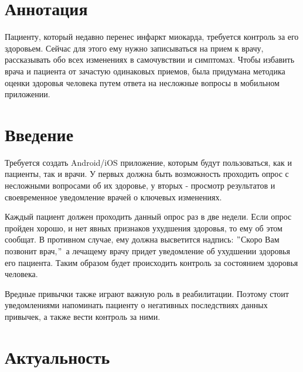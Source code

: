 \documentclass[a4paper,12pt]{article}
\begin{document}
    \section*{Аннотация}

    Пациенту, который недавно перенес инфаркт миокарда, требуется контроль за его здоровьем.
    Сейчас для этого ему нужно записываться на прием к врачу, рассказывать обо всех изменениях в самочувствии и симптомах.
    Чтобы избавить врача и пациента от зачастую одинаковых приемов, была придумана методика оценки здоровья человека путем ответа на несложные вопросы в мобильном приложении.

    \newpage

    \section*{Введение}
    \label{sec:4}
    Требуется создать Android/iOS приложение, которым будут пользоваться, как и пациенты, так и врачи.
    У первых должна быть возможность проходить опрос с несложными вопросами об их здоровье, у вторых - просмотр результатов и своевременное уведомление врачей о ключевых изменениях.  \par
    Каждый пациент должен проходить данный опрос раз в две недели.
    Если опрос пройден хорошо, и нет явных признаков ухудшения здоровья, то ему об этом сообщат.
    В противном случае, ему должна высветится надпись: \("\)Скоро Вам позвонит врач,\("\)\, а лечащему врачу придет уведомление об ухудшении здоровья его пациента.
    Таким образом будет происходить контроль за состоянием здоровья человека. \par
    Вредные привычки также играют важную роль в реабилитации.
    Поэтому стоит уведомлениями напоминать пациенту о негативных последствиях данных привычек, а также вести контроль за ними.

    \newpage

    \section{Актуальность}\label{sec:}
\end{document}

